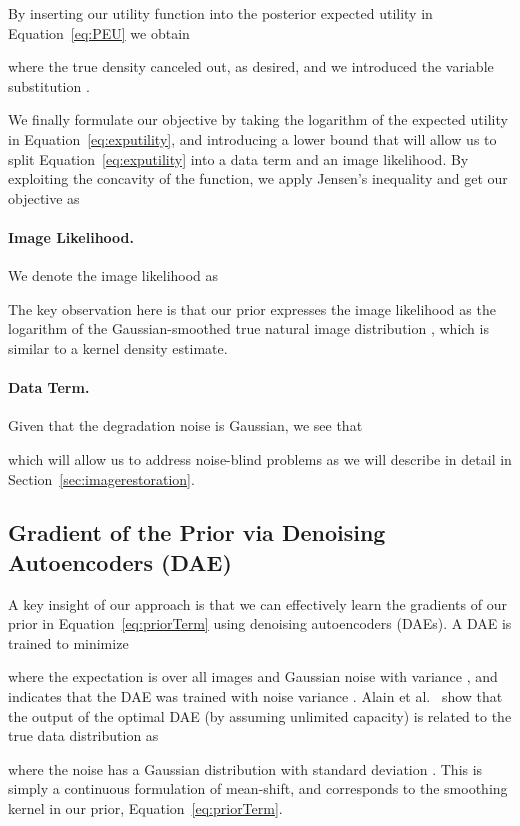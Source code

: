 \documentclass{article}
\begin{document}
By inserting our utility function into the posterior expected utility in Equation~\eqref{eq:PEU} we obtain

where the true density  canceled out, as desired, and we introduced the variable substitution .


We finally formulate our objective by taking the logarithm of the expected utility in Equation~\eqref{eq:exputility}, and introducing a lower bound that will allow us to split Equation~\eqref{eq:exputility} into a data term and an image likelihood. By exploiting the concavity of the  function, we apply Jensen's inequality and get our objective  as



\paragraph{Image Likelihood.}
We denote the image likelihood as

The key observation here is that our prior expresses the image likelihood as the logarithm of the Gaussian-smoothed true natural image distribution , which is similar to a kernel density estimate.

\paragraph{Data Term.}
Given that the degradation noise is Gaussian, we see that~\cite{Jin:2017:NBD}

which will allow us to address noise-blind problems as we will describe in detail in Section~\ref{sec:imagerestoration}.

\subsection{Gradient of the Prior via Denoising Autoencoders (DAE)}
\label{sec:dae}

A key insight of our approach is that we can effectively learn the gradients of our prior in Equation~\eqref{eq:priorTerm} using denoising autoencoders (DAEs). 
A DAE  is trained to minimize~\cite{Vincent:2008:ECR} 

where the expectation is over all images  and Gaussian noise  with variance , and  indicates that the DAE was trained with noise variance . 
Alain et al.~\cite{JMLR:v15:alain14a} show that the output  of the optimal DAE (by assuming unlimited capacity) is related to the true data distribution  as

where the noise has a Gaussian distribution  with standard deviation . This is simply a continuous formulation of mean-shift, and  corresponds to the smoothing kernel in our prior, Equation~\eqref{eq:priorTerm}.
\end{document}

